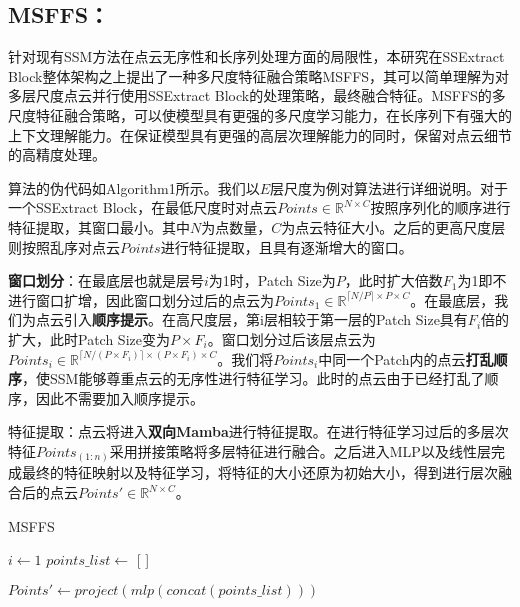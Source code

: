 \documentclass[preprint,12pt]{elsarticle}
\begin{document}
\subsection{MSFFS：}
针对现有SSM方法在点云无序性和长序列处理方面的局限性，本研究在SSExtract Block整体架构之上提出了一种多尺度特征融合策略MSFFS，其可以简单理解为对多层尺度点云并行使用SSExtract Block的处理策略，最终融合特征。MSFFS的多尺度特征融合策略，可以使模型具有更强的多尺度学习能力，在长序列下有强大的上下文理解能力。在保证模型具有更强的高层次理解能力的同时，保留对点云细节的高精度处理。

算法的伪代码如Algorithm1所示。我们以$E$层尺度为例对算法进行详细说明。对于一个SSExtract Block，在最低尺度时对点云$Points\in\mathbb{R}^{N\times{C}}$按照序列化的顺序进行特征提取，其窗口最小。其中$N$为点数量，$C$为点云特征大小。之后的更高尺度层则按照乱序对点云$Points$进行特征提取，且具有逐渐增大的窗口。

\textbf{窗口划分}：在最底层也就是层号$i$为1时，Patch Size为$P$，此时扩大倍数$F_1$为1即不进行窗口扩增，因此窗口划分过后的点云为$Points_{1}\in\mathbb{R}^{\lceil N/P \rceil\times P \times C}$。在最底层，我们为点云引入\textbf{顺序提示}。在高尺度层，第i层相较于第一层的Patch Size具有$F_{i}$倍的扩大，此时Patch Size变为$P\times F_{i}$。窗口划分过后该层点云为$Points_{i}\in\mathbb{R}^{\lceil N/(P\times F_{i}) \rceil\times (P\times F_{i}) \times C}$。我们将$Points_{i}$中同一个Patch内的点云\textbf{打乱顺序}，使SSM能够尊重点云的无序性进行特征学习。此时的点云由于已经打乱了顺序，因此不需要加入顺序提示。

特征提取：点云将进入\textbf{双向Mamba}进行特征提取。在进行特征学习过后的多层次特征$Points_{(1:n)}$采用拼接策略将多层特征进行融合。之后进入MLP以及线性层完成最终的特征映射以及特征学习，将特征的大小还原为初始大小，得到进行层次融合后的点云$Points'\in\mathbb{R}^{N\times{C}}$。



	\begin{algorithm}[H]
		\SetAlgoLined %
		\caption{MSFFS} %
		
		$i \leftarrow 1$ \;
		 $points\_list \leftarrow$ [ ]\;
		
		$Points' \leftarrow project(mlp(concat(points\_list)))$\;
		
	\end{algorithm}
\end{document}
